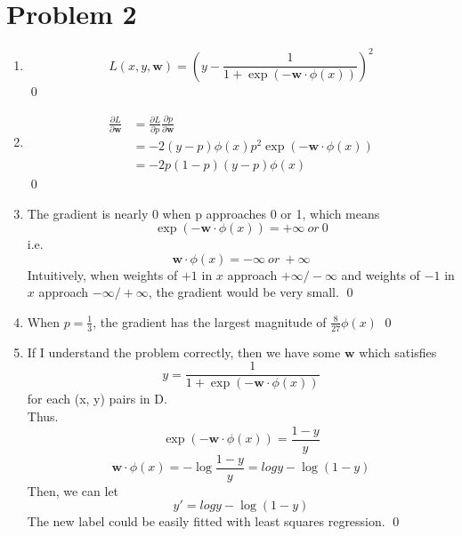 \documentclass[12pt]{article}
\begin{document}
\section*{Problem 2}    
\begin{enumerate}[label=(\alph*)]
  \item
    \begin{equation}
        L(x, y, \mathbf{w}) = (y - \frac{1}{1+\exp({-\mathbf{w}\cdot\phi(x)})})^2
    \end{equation} \qed
  
  \item
    \begin{align}
      \frac{\partial L}{\partial\mathbf{w}} &= \frac{\partial L}{\partial p}\frac{\partial p}{\partial \mathbf{w}} \\
      &= -2(y-p)\phi(x)p^2\exp({-\mathbf{w}\cdot\phi(x)}) \\
      &= -2p(1-p)(y-p)\phi(x)
    \end{align} \qed
    
  \item
    The gradient is nearly 0 when p approaches 0 or 1, which means
    \begin{equation}
      \exp{(-\mathbf{w}\cdot\phi(x))} = +\infty \: or \: 0
    \end{equation}
    i.e.
    \begin{equation}
      \mathbf{w}\cdot\phi(x) = -\infty \: or \: +\infty
    \end{equation}
    Intuitively, when weights of $+1$ in $x$ approach $+\infty/-\infty$ and weights of $-1$ in $x$ approach $-\infty/+\infty$, the gradient would be very small. \qed

  \item
    When $p=\frac{1}{3}$, the gradient has the largest magnitude of $\frac{8}{27}\phi(x)$ \qed
    
  \item
    If I understand the problem correctly, then we have some $\mathbf{w}$ which satisfies
    \begin{equation}
      y = \frac{1}{1+\exp{(-\mathbf{w}\cdot\phi(x))}}
    \end{equation}
    for each (x, y) pairs in D.\\
    Thus.
    \begin{equation}
      \exp{(-\mathbf{w}\cdot\phi(x))} = \frac{1-y}{y}
    \end{equation}
    \begin{equation}
      \mathbf{w}\cdot\phi(x) = -\log{\frac{1-y}{y}}=log{y}-\log{(1-y)}
    \end{equation}
    Then, we can let
    \begin{equation}
      y'=log{y}-\log{(1-y)}
    \end{equation}
    The new label could be easily fitted with least squares regression. \qed

\end{enumerate}
\end{document}
